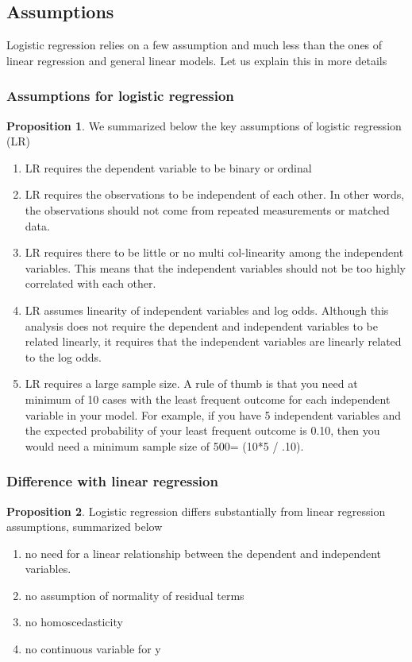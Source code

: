 \documentclass[a4paper]{article}
\theoremstyle{definition}
\theoremstyle{proposition}
\newtheorem{proposition}{Proposition}[section]
\begin{document}
\subsection{Assumptions}
Logistic regression relies on a few assumption and much less than the ones of linear regression and general linear models. Let us explain this in more details
\subsubsection{Assumptions for logistic regression}

\begin{proposition}
We summarized below the key assumptions of logistic regression (LR)
\begin{enumerate}
\item LR requires the dependent variable to be binary or ordinal 
\item LR  requires the observations to be independent of each other.  In other words, the observations should not come from repeated measurements or matched data.
\item LR  requires there to be little or no multi col-linearity among the independent variables.  This means that the independent variables should not be too highly correlated with each other.
\item  LR  assumes linearity of independent variables and log odds.  Although this analysis does not require the dependent and independent variables to be related linearly, it requires that the independent variables are linearly related to the log odds.
\item LR requires a large sample size.  A rule of thumb is that you need at minimum of 10 cases with the least frequent outcome for each independent variable in your model. 
For example, if you have 5 independent variables and the expected probability of your least frequent outcome is 0.10, then you would need a minimum sample size of 500= (10*5 / .10).
\end{enumerate}
\end{proposition}

\subsubsection{Difference with linear regression}
\begin{proposition}
Logistic regression differs substantially from linear regression assumptions, summarized below
\begin{enumerate}
\item no need for a linear relationship between the dependent and independent variables.  
\item no assumption of normality of residual terms
\item no homoscedasticity 
\item no continuous variable for y
\end{enumerate}
\end{proposition}
\end{document}
